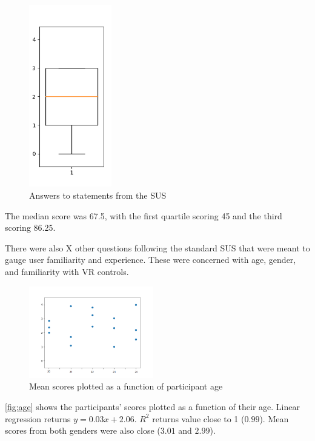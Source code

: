 \begin{figure}[h]
\includegraphics[width=0.32\textwidth]{10.png}
\caption{Answers to statements from the SUS}
\label{fig:one}
\end{figure}

The median score was 67.5, with the first quartile scoring 45 and the third scoring 86.25. %

There were also X other questions following the standard SUS that were meant to gauge user familiarity and experience. These were concerned with age, gender, and familiarity with VR controls. 

\begin{figure}[H]
	\centering
	\includegraphics[width = 0.48\textwidth]{age.png}
	\caption{Mean scores plotted as a function of participant age}
	\label{fig:age}
\end{figure}

\autoref{fig:age} shows the participants' scores plotted as a function of their age. Linear regression returns $y = 0.03x + 2.06$. $R^2$ returns value close to 1 ($0.99$). Mean scores from both genders were also close ($ 3.01 $ and $ 2.99 $). 

